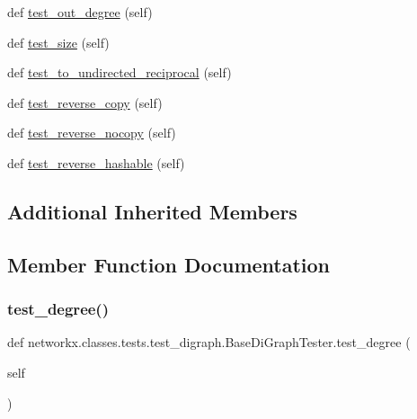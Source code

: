 \begin{DoxyCompactItemize}
\item 
def \hyperlink{classnetworkx_1_1classes_1_1tests_1_1test__digraph_1_1BaseDiGraphTester_aa4a22a575997f0b8744d50e41416df87}{test\+\_\+out\+\_\+degree} (self)
\item 
def \hyperlink{classnetworkx_1_1classes_1_1tests_1_1test__digraph_1_1BaseDiGraphTester_a609432f725141fbf012625f075608efd}{test\+\_\+size} (self)
\item 
def \hyperlink{classnetworkx_1_1classes_1_1tests_1_1test__digraph_1_1BaseDiGraphTester_a5ebea18748d5ee8b38b05eb1944aa624}{test\+\_\+to\+\_\+undirected\+\_\+reciprocal} (self)
\item 
def \hyperlink{classnetworkx_1_1classes_1_1tests_1_1test__digraph_1_1BaseDiGraphTester_a47bcb6feae8adcc1787bb9152e21b460}{test\+\_\+reverse\+\_\+copy} (self)
\item 
def \hyperlink{classnetworkx_1_1classes_1_1tests_1_1test__digraph_1_1BaseDiGraphTester_a7ddd717a14eec5df9a7837e3262e5191}{test\+\_\+reverse\+\_\+nocopy} (self)
\item 
def \hyperlink{classnetworkx_1_1classes_1_1tests_1_1test__digraph_1_1BaseDiGraphTester_abd77e66462d2ec4f6ddfcdd8191c6e25}{test\+\_\+reverse\+\_\+hashable} (self)
\end{DoxyCompactItemize}
\subsection*{Additional Inherited Members}


\subsection{Member Function Documentation}
\mbox{\label{classnetworkx_1_1classes_1_1tests_1_1test__digraph_1_1BaseDiGraphTester_a4fe56bc4f4b9edb83861e39d57c2175b}} 
\subsubsection{\texorpdfstring{test\+\_\+degree()}{test\_degree()}}
{\footnotesize\ttfamily def networkx.\+classes.\+tests.\+test\+\_\+digraph.\+Base\+Di\+Graph\+Tester.\+test\+\_\+degree (\begin{DoxyParamCaption}\item[{}]{self }\end{DoxyParamCaption})}

